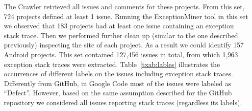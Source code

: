 The Crawler retrieved all issues and comments for these projects.
From this set, 724 projects defined at least 1 issue. Running the ExceptionMiner tool 
 in this set we observed that 183 projects had at least one issue containing an exception stack trace.
 Then we performed further clean up (similar to the one described previously) inspecting the site 
of each project. As a result we could identify 157 Android projects.  This set contained  127,456 issues in total,
 from which 1,963 exception stack traces were extracted. Table~\ref{txab:lables} illustrates the occurrences of different labels 
on the issues including exception stack traces. Differently from GitHub, in Google Code most of 
the issues were labeled as ``Defect''. However, based on the same assumption described for the GitHub repository
 we considered all issues reporting stack traces (regardless its labels).





